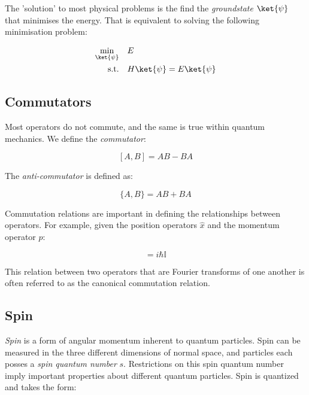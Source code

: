 The 'solution' to most physical problems is the find the \textit{groundstate} $\ket{\psi}$ that minimises the energy. That is equivalent to solving the following minimisation problem: 

\begin{equation}\label{eq:minimisation_problem}
\begin{aligned}
		\min_{\ket{\psi}} \quad &  E \\
		\textrm{s.t.} \quad & H\ket{\psi} = E\ket{\psi}
\end{aligned}
\end{equation}

\subsection{Commutators}\label{subsec:commutators}
Most operators do not commute, and the same is true within quantum mechanics. We define the \textit{commutator}:

\begin{equation}\label{eq:commutator}
	[A, B] = AB - BA
\end{equation}

The \textit{anti-commutator} is defined as:

\begin{equation}\label{eq:anticommutator}
	\{A, B\} = AB + BA
\end{equation}

Commutation relations are important in defining the relationships between operators. For example, given the position operators $\hat{x}$ and the momentum operator $\hat{p}$:

\begin{equation}
	[\hat{x}, \hat{p}] = i \hbar \mathbb{I}
\end{equation}

This relation between two operators that are Fourier transforms of one another is often referred to as the canonical commutation relation.


\subsection{Spin}\label{subsec:spin}
\textit{Spin} is a form of angular momentum inherent to quantum particles. Spin can be measured in the three different dimensions of normal space, and particles each posses a \textit{spin quantum number} $s$. Restrictions on this spin quantum number imply important properties about different quantum particles. Spin is quantized and takes the form:

